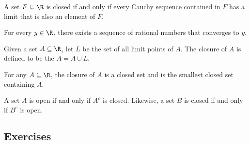\begin{tcolorbox}
\begin{thm}
A set \( F \subseteq \R \) is closed if and only if every Cauchy sequence contained in \( F \) has a limit that is also an element of \( F \). 
\end{thm}
\end{tcolorbox}

\begin{tcolorbox}
\begin{thm}
For every \( y \in \R  \), there exists a sequence of rational numbers that converges to \( y \). 
\end{thm}
\end{tcolorbox}

\begin{tcolorbox}
\begin{defn}
    Given a set \( A \subseteq \R  \), let \( L \) be the set of all limit points of \( A \). The closure of \( A \) is defined to be the \( \bar{A} = A \cup L \). 
\end{defn}
\end{tcolorbox}


\begin{tcolorbox}
\begin{thm}
    For any \( A \subseteq \R  \), the closure of \( \bar{A} \) is a closed set and is the smallest closed set containing \( A \). 
\end{thm}
\end{tcolorbox}

\begin{tcolorbox}
\begin{thm}
A set \( A \) is open if and only if \( A^c \) is closed. Likewise, a set \( B \) is closed if and only if \( B^c \) is open. 
\end{thm}
\end{tcolorbox}


\subsection{Exercises}






